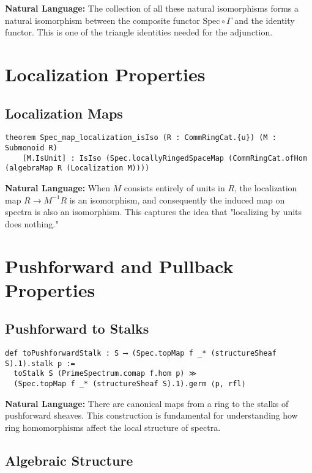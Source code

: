 \documentclass{article}
\theoremstyle{definition}
\begin{document}
\textbf{Natural Language:} The collection of all these natural isomorphisms forms a natural isomorphism between the composite functor $\mathrm{Spec} \circ \Gamma$ and the identity functor. This is one of the triangle identities needed for the adjunction.

\section{Localization Properties}

\subsection{Localization Maps}

\begin{lstlisting}
theorem Spec_map_localization_isIso (R : CommRingCat.{u}) (M : Submonoid R)
    [M.IsUnit] : IsIso (Spec.locallyRingedSpaceMap (CommRingCat.ofHom (algebraMap R (Localization M))))
\end{lstlisting}

\textbf{Natural Language:} When $M$ consists entirely of units in $R$, the localization map $R \to M^{-1}R$ is an isomorphism, and consequently the induced map on spectra is also an isomorphism. This captures the idea that "localizing by units does nothing."

\section{Pushforward and Pullback Properties}

\subsection{Pushforward to Stalks}

\begin{lstlisting}
def toPushforwardStalk : S ⟶ (Spec.topMap f _* (structureSheaf S).1).stalk p :=
  toStalk S (PrimeSpectrum.comap f.hom p) ≫
  (Spec.topMap f _* (structureSheaf S).1).germ ⟨p, rfl⟩
\end{lstlisting}

\textbf{Natural Language:} There are canonical maps from a ring to the stalks of pushforward sheaves. This construction is fundamental for understanding how ring homomorphisms affect the local structure of spectra.

\subsection{Algebraic Structure}
\end{document}
